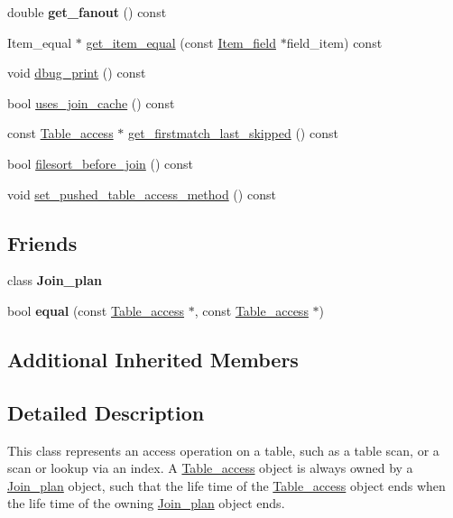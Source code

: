 \begin{DoxyCompactItemize}
double {\bfseries get\+\_\+fanout} () const
\item 
Item\+\_\+equal $\ast$ \mbox{\hyperlink{classAQP_1_1Table__access_afe29ae74c412b36511d0b42bbcb584a2}{get\+\_\+item\+\_\+equal}} (const \mbox{\hyperlink{classItem__field}{Item\+\_\+field}} $\ast$field\+\_\+item) const
\item 
void \mbox{\hyperlink{classAQP_1_1Table__access_a994b8967ecebbdcf1340116d590eef6a}{dbug\+\_\+print}} () const
\item 
bool \mbox{\hyperlink{classAQP_1_1Table__access_a40d58fab243f6b31a9250f697995c783}{uses\+\_\+join\+\_\+cache}} () const
\item 
const \mbox{\hyperlink{classAQP_1_1Table__access}{Table\+\_\+access}} $\ast$ \mbox{\hyperlink{classAQP_1_1Table__access_a8aec8683398027cb6a5302c344285113}{get\+\_\+firstmatch\+\_\+last\+\_\+skipped}} () const
\item 
bool \mbox{\hyperlink{classAQP_1_1Table__access_a21b7ec7cb60cdf31ea1fe3f8a779fb43}{filesort\+\_\+before\+\_\+join}} () const
\item 
void \mbox{\hyperlink{classAQP_1_1Table__access_a0c2933d26dabe26c0f07025f81ec21c3}{set\+\_\+pushed\+\_\+table\+\_\+access\+\_\+method}} () const
\end{DoxyCompactItemize}
\subsection*{Friends}
\begin{DoxyCompactItemize}
\item 
\mbox{\label{classAQP_1_1Table__access_abdd7cfdd7b0a4ca563736d3f0bd75183}} 
class {\bfseries Join\+\_\+plan}
\item 
\mbox{\label{classAQP_1_1Table__access_a37caf970fcd05669da4d4a7df539a8ba}} 
bool {\bfseries equal} (const \mbox{\hyperlink{classAQP_1_1Table__access}{Table\+\_\+access}} $\ast$, const \mbox{\hyperlink{classAQP_1_1Table__access}{Table\+\_\+access}} $\ast$)
\end{DoxyCompactItemize}
\subsection*{Additional Inherited Members}


\subsection{Detailed Description}
This class represents an access operation on a table, such as a table scan, or a scan or lookup via an index. A \mbox{\hyperlink{classAQP_1_1Table__access}{Table\+\_\+access}} object is always owned by a \mbox{\hyperlink{classAQP_1_1Join__plan}{Join\+\_\+plan}} object, such that the life time of the \mbox{\hyperlink{classAQP_1_1Table__access}{Table\+\_\+access}} object ends when the life time of the owning \mbox{\hyperlink{classAQP_1_1Join__plan}{Join\+\_\+plan}} object ends. 

